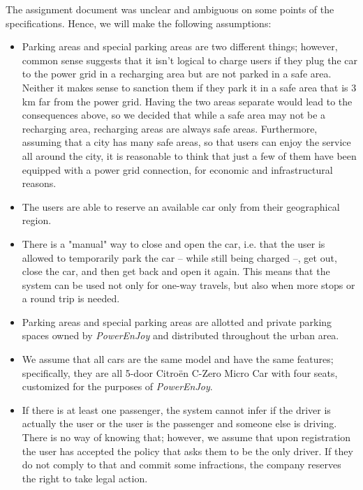 The assignment document was unclear and ambiguous on some points of the specifications. Hence, we will make the following assumptions:
			
			\begin{itemize}
				\item Parking areas and special parking areas are two different things; however, common sense suggests that it isn't logical to charge users if they plug the car to the power grid in a recharging area but are not parked in a safe area. Neither it makes sense to sanction them if they park it in a safe area that is 3 km far from the power grid. Having the two areas separate would lead to the consequences above, so we decided that while a safe area may not be a recharging area, recharging areas are always safe areas. %
				Furthermore, assuming that a city has many safe areas, so that users can enjoy the service all around the city, it is reasonable to think that just a few of them have been equipped with a power grid connection, for economic and infrastructural reasons.
				
				\item The users are able to reserve an available car only from their geographical region. %
				
				\item There is a "manual" way to close and open the car, i.e. that the user is allowed to temporarily park the car – while still being charged –, get out, close the car, and then get back and open it again. This means that the system can be used not only for one-way travels, but also when more stops or a round trip is needed.
				
				\item Parking areas and special parking areas are allotted and private parking spaces owned by \textit{PowerEnJoy} and distributed throughout the urban area. %
				
				\item We assume that all cars are the same model and have the same features; specifically, they are all 5-door Citroën C-Zero Micro Car with four seats, customized for the purposes of \textit{PowerEnJoy}. %
				
				\item If there is at least one passenger, the system cannot infer if the driver is actually the user or the user is the passenger and someone else is driving. There is no way of knowing that; however, we assume that upon registration the user has accepted the policy that asks them to be the only driver. If they do not comply to that and commit some infractions, the company reserves the right to take legal action. 
				
			\end{itemize}
